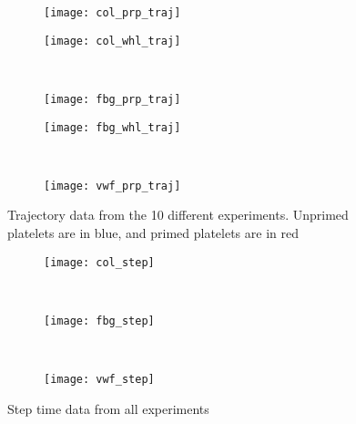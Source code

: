 \documentclass{article}
\begin{document}


\begin{figure}
  \centering
  \begin{subfigure}{0.48\textwidth}
    \texttt{[image: col\_prp\_traj]}
  \end{subfigure}
  \hfill
  \begin{subfigure}{0.48\textwidth}
    \texttt{[image: col\_whl\_traj]}
  \end{subfigure}
  \\
  \begin{subfigure}{0.48\textwidth}
    \texttt{[image: fbg\_prp\_traj]}
  \end{subfigure}
  \hfill
  \begin{subfigure}{0.48\textwidth}
    \texttt{[image: fbg\_whl\_traj]}
  \end{subfigure}
  \\
  \begin{subfigure}{0.48\textwidth}
    \texttt{[image: vwf\_prp\_traj]}
  \end{subfigure}
  \caption{Trajectory data from the 10 different experiments. Unprimed
    platelets are in blue, and primed platelets are in red}
  \label{fig:traj-plots}
\end{figure}

\begin{figure}
  \centering
  \begin{subfigure}{0.75\textwidth}
    \texttt{[image: col\_step]}
  \end{subfigure}
  \\
  \begin{subfigure}{0.75\textwidth}
    \texttt{[image: fbg\_step]}
  \end{subfigure}
  \\
  \begin{subfigure}{0.75\textwidth}
    \texttt{[image: vwf\_step]}
  \end{subfigure}
  \caption{Step time data from all experiments}
  \label{fig:step-time}
\end{figure}
\end{document}

